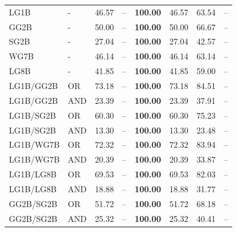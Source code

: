 \documentclass{article}
\begin{document}
{\begin{longtable}{llrrrrrr}
LG1B                     & -       & 46.57            & --            & \textbf{100.00} & 46.57            & 63.54            & --    \\
 GG2B                     & -       & 50.00            & --            & \textbf{100.00} & 50.00            & 66.67            & --    \\
 SG2B                     & -       & 27.04            & --            & \textbf{100.00} & 27.04            & 42.57            & --    \\
 WG7B                     & -       & 46.14            & --            & \textbf{100.00} & 46.14            & 63.14            & --    \\
 LG8B                     & -       & 41.85            & --            & \textbf{100.00} & 41.85            & 59.00            & --    \\
 LG1B/GG2B                & OR      & 73.18            & --            & \textbf{100.00} & 73.18            & 84.51            & --    \\
 LG1B/GG2B                & AND     & 23.39            & --            & \textbf{100.00} & 23.39            & 37.91            & --    \\
 LG1B/SG2B                & OR      & 60.30            & --            & \textbf{100.00} & 60.30            & 75.23            & --    \\
 LG1B/SG2B                & AND     & 13.30            & --            & \textbf{100.00} & 13.30            & 23.48            & --    \\
 LG1B/WG7B                & OR      & 72.32            & --            & \textbf{100.00} & 72.32            & 83.94            & --    \\
 LG1B/WG7B                & AND     & 20.39            & --            & \textbf{100.00} & 20.39            & 33.87            & --    \\
 LG1B/LG8B                & OR      & 69.53            & --            & \textbf{100.00} & 69.53            & 82.03            & --    \\
 LG1B/LG8B                & AND     & 18.88            & --            & \textbf{100.00} & 18.88            & 31.77            & --    \\
 GG2B/SG2B                & OR      & 51.72            & --            & \textbf{100.00} & 51.72            & 68.18            & --    \\
 GG2B/SG2B                & AND     & 25.32            & --            & \textbf{100.00} & 25.32            & 40.41            & --    \\

\end{longtable}}
\end{document}
